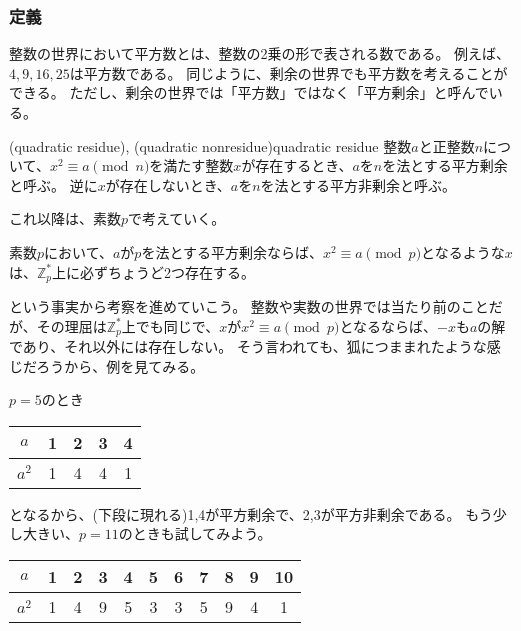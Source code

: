 \subsubsection{定義}
整数の世界において平方数とは、整数の2乗の形で表される数である。
例えば、$4, 9, 16, 25$は平方数である。
同じように、剰余の世界でも平方数を考えることができる。
ただし、剰余の世界では「平方数」ではなく「平方剰余」と呼んでいる。

\begin{Defi}{(quadratic residue), (quadratic nonresidue)}{quadratic residue}
整数$a$と正整数$n$について、$x^2 \equiv a \pmod{n}$を満たす整数$x$が存在するとき、$a$を$n$を法とする平方剰余と呼ぶ。
逆に$x$が存在しないとき、$a$を$n$を法とする平方非剰余と呼ぶ。
\end{Defi}

これ以降は、素数$p$で考えていく。

\begin{Prop}{}{}
素数$p$において、$a$が$p$を法とする平方剰余ならば、$x^2\equiv a\pmod{p}$となるような$x$は、$\mathbb{Z}_p^*$上に必ずちょうど2つ存在する。
\end{Prop}

という事実から考察を進めていこう。
整数や実数の世界では当たり前のことだが、その理屈は$\mathbb{Z}_p^*$上でも同じで、$x$が$x^2\equiv a\pmod{p}$となるならば、$-x$も$a$の解であり、それ以外には存在しない。
そう言われても、狐につままれたような感じだろうから、例を見てみる。

$p=5$のとき
\begin{table}[h]
  \begin{tabular}{|c||c|c|c|c|}\hline
    $a$ & 1 & 2 & 3 & 4 \\\hline
    $a^2$ & 1 & 4 & 4 & 1 \\\hline
  \end{tabular}
\end{table}

となるから、(下段に現れる)1,4が平方剰余で、2,3が平方非剰余である。
もう少し大きい、$p=11$のときも試してみよう。
\begin{table}[h]
  \begin{tabular}{|c||c|c|c|c|c|c|c|c|c|c|}\hline
    $a$ & 1 & 2 & 3 & 4 & 5 & 6 & 7 & 8 & 9 & 10 \\\hline
    $a^2$ & 1 & 4 & 9 & 5 & 3 & 3 & 5 & 9 & 4 & 1 \\\hline
  \end{tabular}
\end{table}

